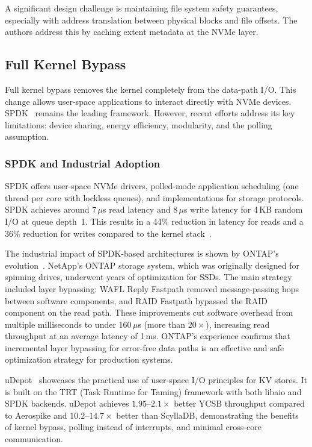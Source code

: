 \documentclass[conference]{IEEEtran}
\begin{document}
A significant design challenge is maintaining file system safety guarantees, especially with address translation between physical blocks and file offsets. The authors address this by caching extent metadata at the NVMe layer.

\subsection{Full Kernel Bypass}
\label{sec:bypass}

Full kernel bypass removes the kernel completely from the data-path I/O. This change allows user-space applications to interact directly with NVMe devices. SPDK~\cite{yang2017spdk} remains the leading framework. However, recent efforts address its key limitations: device sharing, energy efficiency, modularity, and the polling assumption.

\subsubsection{SPDK and Industrial Adoption}
\label{sec:spdk}

SPDK offers user-space NVMe drivers, polled-mode application scheduling (one thread per core with lockless queues), and implementations for storage protocols. SPDK achieves around 7\,$\mu$s read latency and 8\,$\mu$s write latency for 4\,KB random I/O at queue depth~1. This results in a 44\% reduction in latency for reads and a 36\% reduction for writes compared to the kernel stack~\cite{yang2017spdk}.

The industrial impact of SPDK-based architectures is shown by ONTAP's evolution~\cite{curtismaury2024ontap}. NetApp's ONTAP storage system, which was originally designed for spinning drives, underwent years of optimization for SSDs. The main strategy included layer bypassing: WAFL Reply Fastpath removed message-passing hops between software components, and RAID Fastpath bypassed the RAID component on the read path. These improvements cut software overhead from multiple milliseconds to under 160\,$\mu$s (more than $20\times$), increasing read throughput at an average latency of 1\,ms. ONTAP's experience confirms that incremental layer bypassing for error-free data paths is an effective and safe optimization strategy for production systems.

uDepot~\cite{kourtis2019udepot} showcases the practical use of user-space I/O principles for KV stores. It is built on the TRT (Task Runtime for Taming) framework with both libaio and SPDK backends. uDepot achieves $1.95$--$2.1\times$ better YCSB throughput compared to Aerospike and $10.2$--$14.7\times$ better than ScyllaDB, demonstrating the benefits of kernel bypass, polling instead of interrupts, and minimal cross-core communication.
\end{document}
